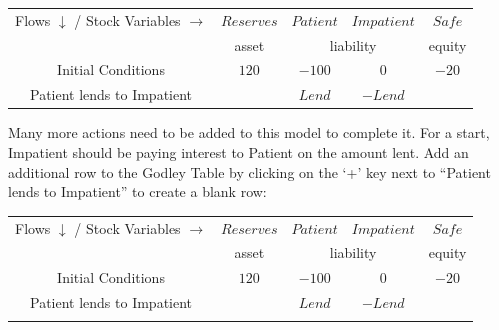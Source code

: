 \begin{center}
\begin{tabular}{|c|cccc|}
\hline
Flows $\downarrow$ / Stock Variables $\rightarrow$&\multicolumn{1}{|c|}{$Reserves$}&\multicolumn{1}{|c|}{$Patient$}&\multicolumn{1}{|c|}{$Impatient$}&\multicolumn{1}{|c|}{$Safe$}\\\cline{2-5}&\multicolumn{1}{|c|}{asset}&\multicolumn{2}{|c|}{liability}&\multicolumn{1}{|c|}{equity}\\\hline
Initial Conditions&$120$&$-100$&$0$&$-20$\\
Patient lends to Impatient&&$Lend$&$-Lend$&\\
\hline
\end{tabular}
\end{center}

Many more actions need to be added to this model to complete it. For a
start, Impatient should be paying interest to Patient on the amount
lent. Add an additional row to the Godley Table by clicking on the
`+' key
next to ``Patient lends to Impatient'' to create a blank row:

\begin{center}
\begin{tabular}{|c|cccc|}
\hline
Flows $\downarrow$ / Stock Variables $\rightarrow$&\multicolumn{1}{|c|}{$Reserves$}&\multicolumn{1}{|c|}{$Patient$}&\multicolumn{1}{|c|}{$Impatient$}&\multicolumn{1}{|c|}{$Safe$}\\\cline{2-5}&\multicolumn{1}{|c|}{asset}&\multicolumn{2}{|c|}{liability}&\multicolumn{1}{|c|}{equity}\\\hline
Initial Conditions&$120$&$-100$&$0$&$-20$\\
Patient lends to Impatient&&$Lend$&$-Lend$&\\
&&&&\\
\hline
\end{tabular}
\end{center}

